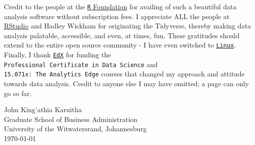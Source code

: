\documentclass[a4paper, nobind]{templates/ociamthesis}
\begin{document}
\begin{romanpages}
\begin{acknowledgements}
  Credit to the people at the \href{https://www.r-project.org/foundation/}{\texttt{R} Foundation} for availing of such a beautiful data analysis software without subscription fees. I appreciate ALL the people at \href{http://rstudio.com}{RStudio} and Hadley Wickham for originating the Tidyverse, thereby making data analysis palatable, accessible, and even, at times, fun. These gratitudes should extend to the entire open source community - I have even switched to \href{https://www.linuxfoundation.org/}{\texttt{Linux}}. Finally, I thank \href{https://www.edx.org/}{\texttt{EdX}} for funding the \texttt{Professional\ Certificate\ in\ Data\ Science} and \texttt{15.071x:\ The\ Analytics\ Edge} courses that changed my approach and attitude towards data analysis. Credit to anyone else I may have omitted; a page can only go so far.

  \begin{flushright}
  John King'athia Karuitha \\
  Graduate School of Business Administration \\
  University of the Witwatersrand, Johannesburg \\
  \today
  \end{flushright}
\end{acknowledgements}

\begin{abstract}
	This \emph{R Markdown} template is for writing an Oxford University thesis. The template is built using Yihui Xie's \texttt{bookdown} package, with heavy inspiration from Chester Ismay's \texttt{thesisdown} and the \texttt{OxThesis} \LaTeX~template (most recently adapted by John McManigle).

 This template's sample content include illustrations of how to write a thesis in R Markdown, and largely follows the structure from \href{https://ulyngs.github.io/rmarkdown-workshop-2019/}{this R Markdown workshop}.

 Congratulations for taking a step further into the lands of open, reproducible science by writing your thesis using a tool that allows you to transparently include tables and dynamically generated plots directly from the underlying data. Hip hooray!
\end{abstract}

\begin{declaration}
 	\vspace{45mm}


\end{declaration}
\end{romanpages}
\end{document}
